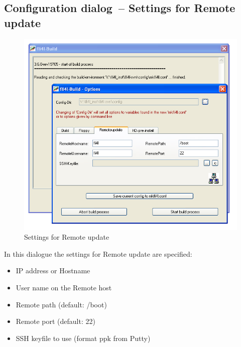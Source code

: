   \subsection{Configuration dialog~-- Settings for Remote update}
  \begin{figure}[ht!]
  \centering
  \includegraphics[width=\columnwidth]{win_build_remoteupdate}
  \caption{Settings for Remote update}
  \label{fig:win_build_remoteupdate}
  \end{figure}

  In this dialogue the settings for Remote update are specified:
  \begin{itemize}
    \item IP address or Hostname
    \item User name on the Remote host
    \item Remote path (default: /boot)
    \item Remote port (default: 22)
    \item SSH keyfile to use (format ppk from Putty)
  \end{itemize}

